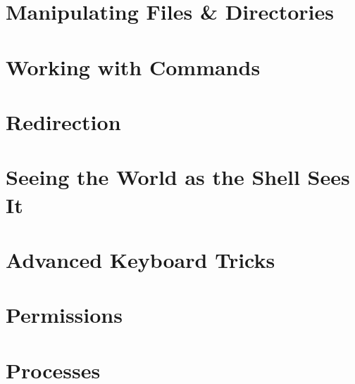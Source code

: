 \documentclass[oneside]{book}
\numberwithin{equation}{section}
\begin{document}

\section{Manipulating Files \& Directories}


\section{Working with Commands}


\section{Redirection}


\section{Seeing the World as the Shell Sees It}


\section{Advanced Keyboard Tricks}


\section{Permissions}


\section{Processes}

\end{document}

